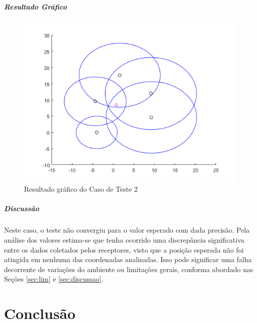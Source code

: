 	\subparagraph{Resultado Gráfico}
	\begin{figure}[h]
		\centering
		\includegraphics[scale = 0.7]{ct_2}
		\caption{Resultado gráfico do Caso de Teste 2}
	\end{figure}

	\subparagraph{Discussão}
	Neste caso, o teste não convergiu para o valor esperado com dada precisão. Pela
	análise dos valores estima-se que tenha ocorrido uma discrepância significativa
	entre os dados coletados pelos receptores, visto que a posição esperada não foi
	atingida em nenhuma das coordenadas analisadas. Isso pode significar uma falha
	decorrente de variações do ambiente ou limitações gerais, conforma abordado nas
	Seções \ref{sec:lim} e \ref{sec:discussao}.

	\section{Conclusão}
	\label{sec:conclusao}


	
	

